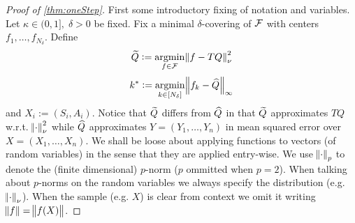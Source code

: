 \begin{proof}[Proof of \cref{thm:oneStep}]
  First some introductory fixing of notation and variables.
  Let $\kappa \in (0,1],\; \delta > 0$ be fixed.
  Fix a minimal $\delta$-covering of $\mathcal{F}$
  with centers $f_1, \dots, f_{N_\delta}$.
  Define
  \[ \widetilde{Q} := \operatorname*{argmin}_{f \in \mathcal{F}} \norm{f - TQ}_{\nu}^2 \]
  \[ k^* := \operatorname*{argmin}_{k \in [N_\delta]} \norm{f_k - \widehat{Q}}_\infty \]
  and $ X_i := (S_i, A_i) $.
  Notice that $\widetilde{Q}$ differs from $\widehat{Q}$ in that
  $\widetilde{Q}$ approximates $TQ$ w.r.t. $\norm{\cdot}^2_\nu$ while
  $\widehat{Q}$ approximates $Y = (Y_1, \dots, Y_n)$ in mean squared error over
  $X = (X_1, \dots, X_n)$.
  We shall be loose about applying functions to vectors
  (of random variables)
  in the sense that they are applied entry-wise.
  We use $\norm{\cdot}_p$ to denote the (finite dimensional) $p$-norm
  ($p$ ommitted when $p=2$).
  When talking about $p$-norms on the random variables we always specify
  the distribution (e.g. $\norm{\cdot}_\nu$).
  When the sample (e.g. $X$) is clear from context we omit it writing
  $\norm{f} = \norm{f(X)}$.
  

\end{proof}
